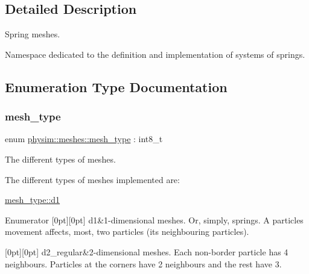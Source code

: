 \subsection{Detailed Description}
Spring meshes. 

Namespace dedicated to the definition and implementation of systems of springs. 

\subsection{Enumeration Type Documentation}
\mbox{\label{namespacephysim_1_1meshes_a0a3501674fecdbcbbee92c4c3bb68a67}} 
\subsubsection{\texorpdfstring{mesh\+\_\+type}{mesh\_type}}
{\footnotesize\ttfamily enum \hyperlink{namespacephysim_1_1meshes_a0a3501674fecdbcbbee92c4c3bb68a67}{physim\+::meshes\+::mesh\+\_\+type} \+: int8\+\_\+t\hspace{0.3cm}{\ttfamily [strong]}}



The different types of meshes. 

The different types of meshes implemented are\+:
\begin{DoxyItemize}
\item \hyperlink{namespacephysim_1_1meshes_a0a3501674fecdbcbbee92c4c3bb68a67a9948c645c094247794f4c7acdbeb2bb6}{mesh\+\_\+type\+::d1} 
\end{DoxyItemize}\begin{DoxyEnumFields}{Enumerator}
[0pt][0pt]{}\mbox{\label{namespacephysim_1_1meshes_a0a3501674fecdbcbbee92c4c3bb68a67a9948c645c094247794f4c7acdbeb2bb6}} 
d1&1-\/dimensional meshes. Or, simply, springs. A particle\textquotesingle{}s movement affects, most, two particles (its neighbouring particles). \\
\hline

[0pt][0pt]{}\mbox{\label{namespacephysim_1_1meshes_a0a3501674fecdbcbbee92c4c3bb68a67ab5de808d7817e13049b1c782586af757}} 
d2\+\_\+regular&2-\/dimensional meshes. Each non-\/border particle has 4 neighbours. Particles at the corners have 2 neighbours and the rest have 3. \\
\hline

\end{DoxyEnumFields}
